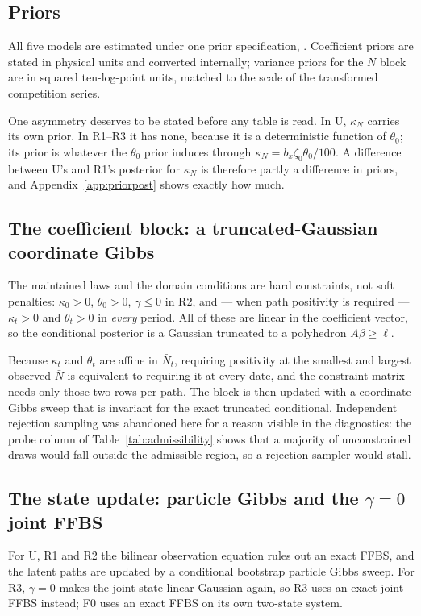 \documentclass[11pt]{article}
\newcommand{\code}[1]{\texttt{#1}}
\newcommand{\kt}{\kappa_t}
\newcommand{\Nbar}{\bar N}
\begin{document}
\subsection{Priors}
All five models are estimated under one prior specification,
\code{\TheoryPriorSpec}. Coefficient priors are stated in physical units and
converted internally; variance priors for the $N$ block are in squared
ten-log-point units, matched to the scale of the transformed competition series.

\par\medskip


\par\medskip\noindent
One asymmetry deserves to be stated before any table is read. In U, $\kappa_N$
carries its own prior. In R1--R3 it has none, because it is a deterministic
function of $\theta_0$; its prior is whatever the $\theta_0$ prior induces
through $\kappa_N=b_x\zeta_0\theta_0/100$. A difference between U's and R1's
posterior for $\kappa_N$ is therefore partly a difference in priors, and
Appendix~\ref{app:priorpost} shows exactly how much.

\subsection{The coefficient block: a truncated-Gaussian coordinate Gibbs}
The maintained laws and the domain conditions are hard constraints, not soft
penalties: $\kappa_0>0$, $\theta_0>0$, $\gamma\le0$ in R2, and --- when path
positivity is required --- $\kt>0$ and $\theta_t>0$ in \emph{every} period. All
of these are linear in the coefficient vector, so the conditional posterior is a
Gaussian truncated to a polyhedron $A\beta\ge\ell$.

Because $\kt$ and $\theta_t$ are affine in $\Nbar_t$, requiring positivity at
the smallest and largest observed $\Nbar$ is equivalent to requiring it at every
date, and the constraint matrix needs only those two rows per path. The block is
then updated with a coordinate Gibbs sweep that is invariant for the exact
truncated conditional. Independent rejection sampling was abandoned here for a
reason visible in the diagnostics: the probe column of
Table~\ref{tab:admissibility} shows that a majority of unconstrained draws would
fall outside the admissible region, so a rejection sampler would stall.

\subsection{The state update: particle Gibbs and the $\gamma=0$ joint FFBS}
For U, R1 and R2 the bilinear observation equation rules out an exact FFBS, and
the latent paths are updated by a conditional bootstrap particle Gibbs sweep.
For R3, $\gamma=0$ makes the joint state linear-Gaussian again, so R3 uses an
exact joint FFBS instead; F0 uses an exact FFBS on its own two-state system.
\end{document}
